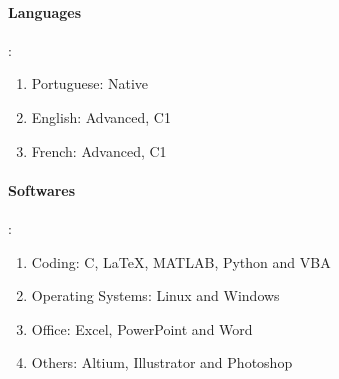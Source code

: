 \documentclass[8pt, a4paper]{article}
\begin{document}
\spacedhrule{0.5em}{-0.4em}


\begin{multicols}{2}
    \paragraph{Languages}:
    \begin{enumerate}
        \item Portuguese: Native
        \item English: Advanced, C1
        \item French: Advanced, C1
    \end{enumerate}
    \columnbreak
    \paragraph{Softwares}:
    \begin{enumerate}
        \item Coding: C, LaTeX, MATLAB, Python and VBA
        \item Operating Systems: Linux and Windows
        \item Office: Excel, PowerPoint and Word
        \item Others: Altium, Illustrator and Photoshop
    \end{enumerate}
\end{multicols}
\end{document}
